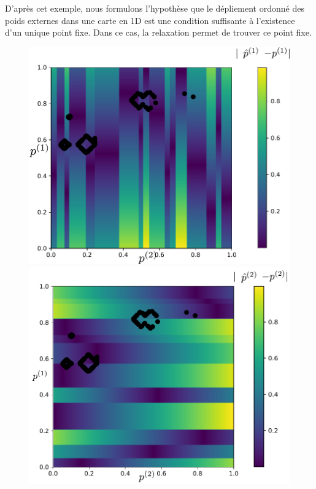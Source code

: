 \documentclass[../main]{subfiles}
\begin{document}
D'après cet exemple, nous formulons l'hypothèse que le dépliement ordonné des poids externes dans une carte en 1D est une condition suffisante à l'existence d'un unique point fixe. 
Dans ce cas, la relaxation permet de trouver ce point fixe.


\begin{figure}
\begin{minipage}{0.5\textwidth}
\centering
\includegraphics[width=\textwidth]{champ_X_006_t1_notraj.pdf}
\end{minipage}
\begin{minipage}{0.5\textwidth}
\centering
\includegraphics[width=\textwidth]{champ_Y_006_t1_notraj.pdf}

\end{minipage}
\end{figure}
\end{document}
